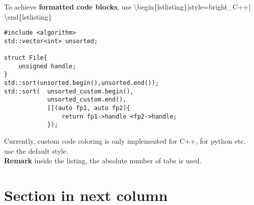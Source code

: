 \documentclass[\fontheight]{extarticle}
\begin{document}
\begin{multicols*}{3}
    To achieve \textbf{formatted code blocks}, use \newline
    \textbackslash{begin}\{lstlisting\}[style=bright\_C++]\newline 
    \newline
    \textbackslash{end}\{lstlisting\}\vspace*{4pt}
    \begin{lstlisting}[style=bright_C++]
#include <algorithm>
std::vector<int> unsorted;

struct File{
    unsigned handle;
}
std::sort(unsorted.begin(),unsorted.end());
std::sort(  unsorted_custom.begin(),
            unsorted_custom.end(),
            [](auto fp1, auto fp2){
                return fp1->handle <fp2->handle;
            });
    \end{lstlisting}
    Currently, custom code coloring is only implemented for C++, for python etc. use the default style.\\
    
    \textbf{Remark} inside the listing, the absolute number of tabs is used.
    
    \newcol{}
    
    \section{Section in next column}
    
    
\end{multicols*}
\end{document}

